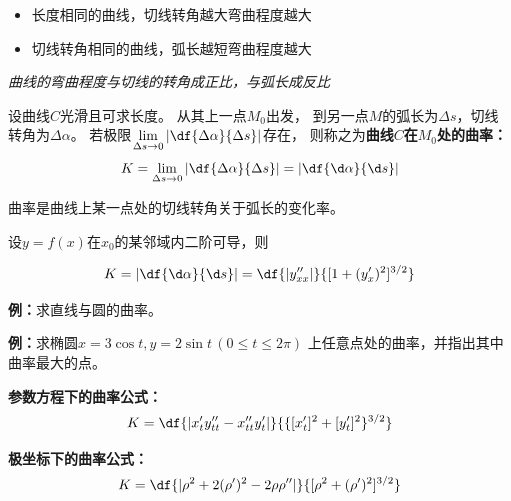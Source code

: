 \begin{itemize}
  \setlength{\itemindent}{1cm}
  \item 长度相同的曲线，切线转角越大弯曲程度越大
  \item 切线转角相同的曲线，弧长越短弯曲程度越大
\end{itemize}

{\it 曲线的弯曲程度与切线的转角成正比，与弧长成反比}

\begin{thx}
	设曲线$C$光滑且可求长度。 从其上一点$M_0$出发，
	到另一点$M$的弧长为$\Delta s$，切线转角为$\Delta\alpha$。
	 若极限$\lim\limits_{\Delta s\to
	0}\left|\df{\Delta\alpha}{\Delta s}\right|$存在，
	则称之为{\bf 曲线$C$在$M_0$处的曲率：}
	$${K=\lim\limits_{\Delta s\to
	0}\left|\df{\Delta\alpha}{\Delta s}\right|
	=\left|\df{\d\alpha}{\d s}\right|}$$ 
\end{thx}

曲率是曲线上某一点处的切线转角关于弧长的变化率。


设$y=f(x)$在$x_0$的某邻域内二阶可导，则
\begin{thx}
	$$K=\left|\df{\d\alpha}{\d s}\right|
	 =\df{|y''_{xx}|}{[1+(y'_x)^2]^{3/2}}$$
\end{thx}
 
{\bf 例：}求直线与圆的曲率。

{\bf 例：}求椭圆$x=3\cos t,y=2\sin t\,(0\leq t\leq 2\pi)$
上任意点处的曲率，并指出其中曲率最大的点。

\begin{center}
\end{center}

\begin{thx}
	{\bf 参数方程下的曲率公式：}
	$${K=\df{|x'_ty''_{tt}-x''_{tt}y'_t|}
	{\{[x'_t]^2+[y'_t]^2\}^{3/2}}}$$
	
	{\bf 极坐标下的曲率公式：}
	$$K=\df{|\rho^2+2(\rho')^2-2\rho\rho''|}{[\rho^2+(\rho')^2]^{3/2}}$$
\end{thx}

